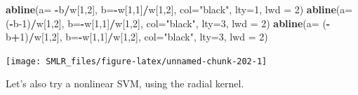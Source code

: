 \documentclass[
]{book}
\newenvironment{Shaded}{\begin{snugshade}}{\end{snugshade}}
\newcommand{\AttributeTok}[1]{\textcolor[rgb]{0.13,0.29,0.53}{#1}}
\newcommand{\DecValTok}[1]{\textcolor[rgb]{0.00,0.00,0.81}{#1}}
\newcommand{\FunctionTok}[1]{\textcolor[rgb]{0.13,0.29,0.53}{\textbf{#1}}}
\newcommand{\NormalTok}[1]{#1}
\newcommand{\SpecialCharTok}[1]{\textcolor[rgb]{0.81,0.36,0.00}{\textbf{#1}}}
\newcommand{\StringTok}[1]{\textcolor[rgb]{0.31,0.60,0.02}{#1}}
\theoremstyle{definition}
\theoremstyle{definition}
\theoremstyle{definition}
\theoremstyle{definition}
\theoremstyle{remark}
\begin{document}
\begin{Shaded}
\begin{Highlighting}[]
    \FunctionTok{abline}\NormalTok{(}\AttributeTok{a=} \SpecialCharTok{{-}}\NormalTok{b}\SpecialCharTok{/}\NormalTok{w[}\DecValTok{1}\NormalTok{,}\DecValTok{2}\NormalTok{], }\AttributeTok{b=}\SpecialCharTok{{-}}\NormalTok{w[}\DecValTok{1}\NormalTok{,}\DecValTok{1}\NormalTok{]}\SpecialCharTok{/}\NormalTok{w[}\DecValTok{1}\NormalTok{,}\DecValTok{2}\NormalTok{], }\AttributeTok{col=}\StringTok{"black"}\NormalTok{, }\AttributeTok{lty=}\DecValTok{1}\NormalTok{, }\AttributeTok{lwd =} \DecValTok{2}\NormalTok{)}
    \FunctionTok{abline}\NormalTok{(}\AttributeTok{a=}\NormalTok{ (}\SpecialCharTok{{-}}\NormalTok{b}\DecValTok{{-}1}\NormalTok{)}\SpecialCharTok{/}\NormalTok{w[}\DecValTok{1}\NormalTok{,}\DecValTok{2}\NormalTok{], }\AttributeTok{b=}\SpecialCharTok{{-}}\NormalTok{w[}\DecValTok{1}\NormalTok{,}\DecValTok{1}\NormalTok{]}\SpecialCharTok{/}\NormalTok{w[}\DecValTok{1}\NormalTok{,}\DecValTok{2}\NormalTok{], }\AttributeTok{col=}\StringTok{"black"}\NormalTok{, }\AttributeTok{lty=}\DecValTok{3}\NormalTok{, }\AttributeTok{lwd =} \DecValTok{2}\NormalTok{)}
    \FunctionTok{abline}\NormalTok{(}\AttributeTok{a=}\NormalTok{ (}\SpecialCharTok{{-}}\NormalTok{b}\SpecialCharTok{+}\DecValTok{1}\NormalTok{)}\SpecialCharTok{/}\NormalTok{w[}\DecValTok{1}\NormalTok{,}\DecValTok{2}\NormalTok{], }\AttributeTok{b=}\SpecialCharTok{{-}}\NormalTok{w[}\DecValTok{1}\NormalTok{,}\DecValTok{1}\NormalTok{]}\SpecialCharTok{/}\NormalTok{w[}\DecValTok{1}\NormalTok{,}\DecValTok{2}\NormalTok{], }\AttributeTok{col=}\StringTok{"black"}\NormalTok{, }\AttributeTok{lty=}\DecValTok{3}\NormalTok{, }\AttributeTok{lwd =} \DecValTok{2}\NormalTok{)}
\end{Highlighting}
\end{Shaded}

\begin{center}\texttt{[image: SMLR\_files/figure-latex/unnamed-chunk-202-1]} \end{center}

Let's also try a nonlinear SVM, using the radial kernel.
\end{document}
